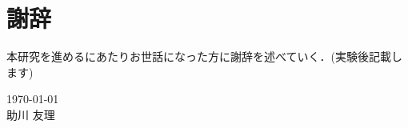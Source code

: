 \chapter*{謝辞}
本研究を進めるにあたりお世話になった方に謝辞を述べていく．(実験後記載します)


\begin{flushright}
\today\\
助川 友理
\end{flushright}

